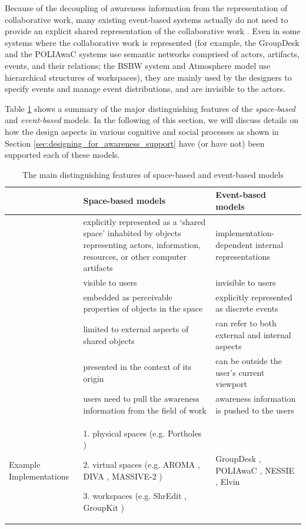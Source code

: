 Because of the decoupling of awareness information from the representation of collaborative work, many existing event-based systems actually do not need to provide an explicit shared representation of the collaborative work \cite{prinz1999a,Fitzpatrick2002}.  Even in some systems where the collaborative work is represented (for example, the GroupDesk \cite{Fuchs1995} and the POLIAwaC systems \cite{sohlenkamp2000po} use semantic networks comprised of actors, artifacts, events, and their relations; the BSBW system \cite{Bentley1995} and Atmosphere model \cite{Rittenbruch2002} use hierarchical structures of workspaces), they are mainly used by the designers to specify events and manage event distributions, and are invisible to the actors.

Table \ref{tab:awareness_models} shows a summary of the major distinguishing features of the \emph{space-based} and \emph{event-based} models. In the following of this section, we will discuss details on how the design aspects in various cognitive and social processes as shown in Section \ref{sec:designing_for_awareness_support} have (or have not) been supported each of these models.

\begin{table}[htbp]
\centering
\footnotesize
\begin{tabular}{>{\raggedright}p{1.1in}>{\raggedright}p{2.2in}>{\raggedright}p{2.2in}}
\toprule 
 & \textbf{Space-based models} & \textbf{Event-based models}\tabularnewline
\midrule 
\multirow{2}{1.1in}{Representation of the collaborative work} & explicitly represented as a `shared space' inhabited by objects representing
actors, information, resources, or other computer artifacts  & implementation-dependent internal representations\tabularnewline
\cmidrule{2-3} 
 & visible to users & invisible to users\tabularnewline
\midrule 
\multirow{4}{1.1in}{Awareness information} & embedded as perceivable properties of objects in the space & explicitly represented as discrete events\tabularnewline
\cmidrule{2-3} 
 & limited to external aspects of shared objects  & can refer to both external and internal aspects\tabularnewline
\cmidrule{2-3} 
 & presented in the context of its origin & can be outside the user's current viewport\tabularnewline
\cmidrule{2-3} 
 & users need to pull the awareness information from the field of work & awareness information is pushed to the users\tabularnewline
\midrule 
Example Implementations & 1. physical spaces (e.g. Portholes \cite{Dourish1992})

2. virtual spaces (e.g. AROMA \cite{Pedersen1997},
DIVA \cite{Berlage1999}, MASSIVE-2 \cite{Benford2001})

3. workspaces (e.g. ShrEdit \cite{dourish1992awareness},
GroupKit \cite{Roseman1996}) & GroupDesk \cite{Fuchs1995}, POLIAwaC \cite{sohlenkamp2000po},
NESSIE \cite{prinz1999a}, Elvin \cite{Fitzpatrick2002}\tabularnewline
\bottomrule
\end{tabular}  
\caption{The main distinguishing features of space-based and event-based models}
\label{tab:awareness_models}
\end{table}

